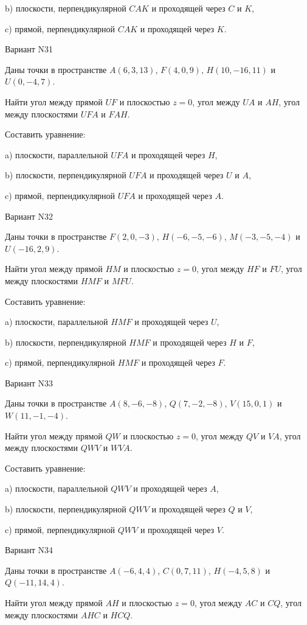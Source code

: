 \documentclass[11pt]{report}
\begin{document}
b) плоскости, перпендикулярной $CAK$ и проходящей через $C$ и $K$,

c) прямой, перпендикулярной $CAK$ и проходящей через $K$.

Вариант N31

Даны точки в пространстве
$A(6, 3, 13)$, $F(4, 0, 9)$, $H(10, -16, 11)$ и
$U(0, -4, 7)$.

Найти угол между прямой $UF$ и плоскостью $z = 0$, угол между $UA$ и $AH$, угол между плоскостями $UFA$ 
и $FAH$.

Составить уравнение: 

a) плоскости, параллельной $UFA$ и проходящей через $H$,

b) плоскости, перпендикулярной $UFA$ и проходящей через $U$ и $A$,

c) прямой, перпендикулярной $UFA$ и проходящей через $A$.

Вариант N32

Даны точки в пространстве
$F(2, 0, -3)$, $H(-6, -5, -6)$, $M(-3, -5, -4)$ и
$U(-16, 2, 9)$.

Найти угол между прямой $HM$ и плоскостью $z = 0$, угол между $HF$ и $FU$, угол между плоскостями $HMF$ 
и $MFU$.

Составить уравнение: 

a) плоскости, параллельной $HMF$ и проходящей через $U$,

b) плоскости, перпендикулярной $HMF$ и проходящей через $H$ и $F$,

c) прямой, перпендикулярной $HMF$ и проходящей через $F$.

Вариант N33

Даны точки в пространстве
$A(8, -6, -8)$, $Q(7, -2, -8)$, $V(15, 0, 1)$ и
$W(11, -1, -4)$.

Найти угол между прямой $QW$ и плоскостью $z = 0$, угол между $QV$ и $VA$, угол между плоскостями $QWV$ 
и $WVA$.

Составить уравнение: 

a) плоскости, параллельной $QWV$ и проходящей через $A$,

b) плоскости, перпендикулярной $QWV$ и проходящей через $Q$ и $V$,

c) прямой, перпендикулярной $QWV$ и проходящей через $V$.

Вариант N34

Даны точки в пространстве
$A(-6, 4, 4)$, $C(0, 7, 11)$, $H(-4, 5, 8)$ и
$Q(-11, 14, 4)$.

Найти угол между прямой $AH$ и плоскостью $z = 0$, угол между $AC$ и $CQ$, угол между плоскостями $AHC$ 
и $HCQ$.
\end{document}
